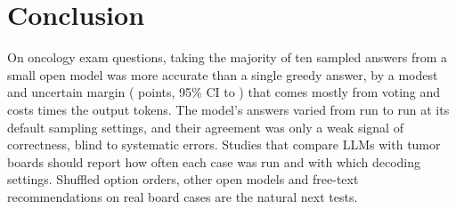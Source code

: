\section{Conclusion}\label{sec:conclusion}
On oncology exam questions, taking the majority of ten sampled answers from a small open model was more accurate than
a single greedy answer, by a modest and uncertain margin (\diffMain{} points, 95\% CI \diffMainLo{} to \diffMainHi)
that comes mostly from voting and costs \tokRatio{} times the output tokens. The model's answers varied from run to run
at its default sampling settings, and their agreement was only a weak signal of correctness, blind to systematic
errors. Studies that compare LLMs with tumor boards should report how often each case was run and with which decoding
settings. Shuffled option orders, other open models and free-text recommendations on real board cases are the natural
next tests.
